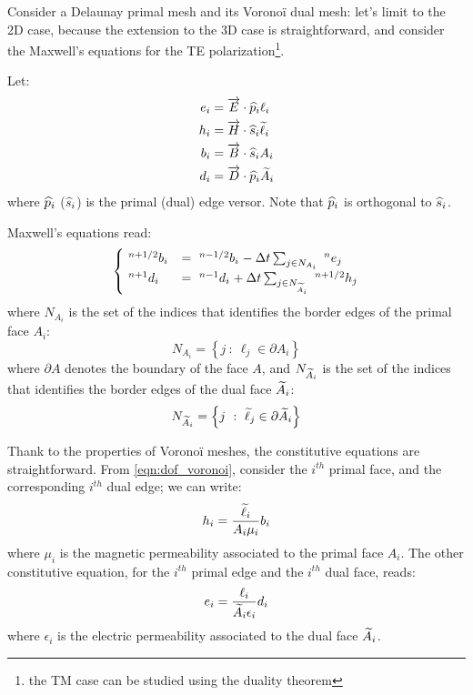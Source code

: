 Consider a Delaunay primal mesh and its Vorono\"i dual mesh: let's
limit to the 2D case, because the extension to the 3D case is
straightforward, and consider the Maxwell's equations for the TE
polarization\footnote{the TM case can be studied using the duality
  theorem}.

Let:
\begin{align} \label{eqn:dof_voronoi}
e_i & = \DotProd{\E}{\Versor{p}_i} \ell_i \\
h_i & = \DotProd{\H}{\Versor{s}_i} \Dual{\ell}_i \\
b_i & = \DotProd{\B}{\Versor{s}_i} A_i \\
d_i & = \DotProd{\D}{\Versor{p}_i} \Dual{A}_i
\end{align}
where $\Versor{p}_i$ ($\Versor{s}_i$) is the primal (dual) edge
versor. Note that $\Versor{p}_i$ is orthogonal to $\Versor{s}_i$.

Maxwell's equations read:
\begin{equation} \label{eqn:maxwell_voronoi} \begin{cases}
    \Disc{b_i}{}{n+1/2} & = \Disc{b_i}{}{n-1/2} - \deltat \sum_{j \in
    N_{A_i}} \Disc{e_j}{}{n} \\
    \Disc{d_i}{}{n+1} & = \Disc{d_i}{}{n-1} + \deltat \sum_{j \in
    N_{\Dual{A}_i}} \Disc{h_j}{}{n+1/2}
  \end{cases} \end{equation}
where $N_{A_i}$ is the set of the indices that identifies the border
edges of the primal face $A_i$:
\begin{equation*}
  N_{A_i} = \left\{ j\ :\ \ell_j \in \partial A_i \right\}
\end{equation*}
where $\partial A$ denotes the boundary of the face $A$, and
$N_{\Dual{A}_i}$ is the set of the indices that identifies the border
edges of the dual face $\Dual{A}_i$:
\begin{equation*}
  N_{\Dual{A}_i} = \left\{ j\ :\ \Dual{\ell}_j \in \partial \Dual{A}_i
  \right\}
\end{equation*}

Thank to the properties of Vorono\"i meshes, the constitutive
equations are straightforward. From \eqref{eqn:dof_voronoi}, consider
the $i^{th}$ primal face, and the corresponding $i^{th}$ dual edge; we
can write:
\begin{equation} \label{eqn:constitutive_voronoi_magnetic}
  h_i = \frac{\Dual{\ell}_i}{A_i \mu_i} b_i
\end{equation}
where $\mu_i$ is the magnetic permeability associated to the primal
face $A_i$. The other constitutive equation, for the $i^{th}$ primal
edge and the $i^{th}$ dual face, reads:
\begin{equation} \label{eqn:constitutive_voronoi_electric}
  e_i = \frac{\ell_i}{\Dual{A}_i \epsilon_i} d_i
\end{equation}
where $\epsilon_i$ is the electric permeability associated to the dual
face $\Dual{A}_i$.

